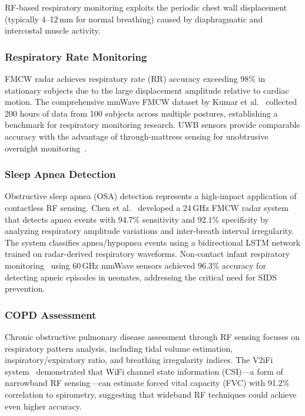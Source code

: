 \documentclass[journal,twoside]{IEEEtran}
\begin{document}
RF-based respiratory monitoring exploits the periodic chest wall displacement (typically 4--12\,mm for normal breathing) caused by diaphragmatic and intercostal muscle activity.

\subsubsection{Respiratory Rate Monitoring}
FMCW radar achieves respiratory rate (RR) accuracy exceeding 98\% in stationary subjects due to the large displacement amplitude relative to cardiac motion. The comprehensive mmWave FMCW dataset by Kumar et al.~\cite{ref_mmwave_dataset2024} collected 200 hours of data from 100 subjects across multiple postures, establishing a benchmark for respiratory monitoring research. UWB sensors provide comparable accuracy with the advantage of through-mattress sensing for unobtrusive overnight monitoring~\cite{ref_uwb_overview2024}.

\subsubsection{Sleep Apnea Detection}
Obstructive sleep apnea (OSA) detection represents a high-impact application of contactless RF sensing. Chen et al.~\cite{ref_radar_complex2025} developed a 24\,GHz FMCW radar system that detects apnea events with 94.7\% sensitivity and 92.1\% specificity by analyzing respiratory amplitude variations and inter-breath interval irregularity. The system classifies apnea/hypopnea events using a bidirectional LSTM network trained on radar-derived respiratory waveforms. Non-contact infant respiratory monitoring~\cite{ref_infant2025} using 60\,GHz mmWave sensors achieved 96.3\% accuracy for detecting apneic episodes in neonates, addressing the critical need for SIDS prevention.

\subsubsection{COPD Assessment}
Chronic obstructive pulmonary disease assessment through RF sensing focuses on respiratory pattern analysis, including tidal volume estimation, inspiratory/expiratory ratio, and breathing irregularity indices. The V2iFi system~\cite{ref_v2ifi2023} demonstrated that WiFi channel state information (CSI)---a form of narrowband RF sensing---can estimate forced vital capacity (FVC) with 91.2\% correlation to spirometry, suggesting that wideband RF techniques could achieve even higher accuracy.
\end{document}
